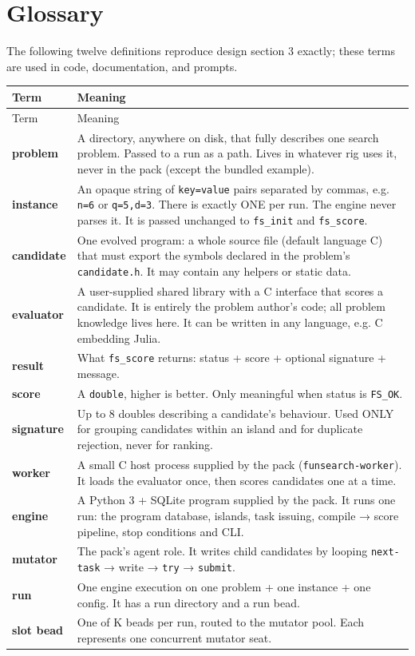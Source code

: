 \documentclass[11pt]{article}
\begin{document}
\section{Glossary}
The following twelve definitions reproduce design section 3 exactly; these
terms are used in code, documentation, and prompts.
\small
\begin{longtable}{@{}p{1.7cm}p{14.8cm}@{}}
\toprule Term & Meaning \\ \midrule
\endfirsthead
\toprule Term & Meaning \\ \midrule
\endhead
\textbf{problem} & A directory, anywhere on disk, that fully describes one search problem. Passed to a run as a path. Lives in whatever rig uses it, never in the pack (except the bundled example). \\
\textbf{instance} & An opaque string of \texttt{key=value} pairs separated by commas, e.g. \texttt{n=6} or \texttt{q=5,d=3}. There is exactly ONE per run. The engine never parses it. It is passed unchanged to \texttt{fs\_init} and \texttt{fs\_score}. \\
\textbf{candidate} & One evolved program: a whole source file (default language C) that must export the symbols declared in the problem's \texttt{candidate.h}. It may contain any helpers or static data. \\
\textbf{evaluator} & A user-supplied shared library with a C interface that scores a candidate. It is entirely the problem author's code; all problem knowledge lives here. It can be written in any language, e.g. C embedding Julia. \\
\textbf{result} & What \texttt{fs\_score} returns: status + score + optional signature + message. \\
\textbf{score} & A \texttt{double}, higher is better. Only meaningful when status is \texttt{FS\_OK}. \\
\textbf{signature} & Up to 8 doubles describing a candidate's behaviour. Used ONLY for grouping candidates within an island and for duplicate rejection, never for ranking. \\
\textbf{worker} & A small C host process supplied by the pack (\texttt{funsearch-worker}). It loads the evaluator once, then scores candidates one at a time. \\
\textbf{engine} & A Python 3 + SQLite program supplied by the pack. It runs one run: the program database, islands, task issuing, compile → score pipeline, stop conditions and CLI. \\
\textbf{mutator} & The pack's agent role. It writes child candidates by looping \texttt{next-task} → write → \texttt{try} → \texttt{submit}. \\
\textbf{run} & One engine execution on one problem + one instance + one config. It has a run directory and a run bead. \\
\textbf{slot bead} & One of K beads per run, routed to the mutator pool. Each represents one concurrent mutator seat. \\
\bottomrule
\end{longtable}
\normalsize
\end{document}
